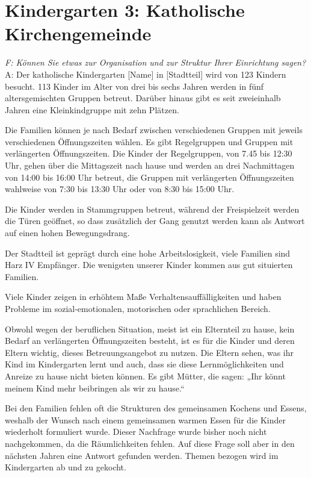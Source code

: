 \section{Kindergarten 3: Katholische Kirchengemeinde}
\begin{linenumbers*}
\emph{F: Können Sie etwas zur Organisation und zur Struktur Ihrer Einrichtung sagen?}
A: Der katholische Kindergarten [Name] in [Stadtteil] wird von 123 Kindern besucht. 113 Kinder im Alter von drei bis sechs Jahren werden in fünf altersgemischten Gruppen betreut.
Darüber hinaus gibt es seit zweieinhalb Jahren eine Kleinkindgruppe mit zehn Plätzen.
 
Die Familien können je nach Bedarf zwischen verschiedenen Gruppen mit jeweils verschiedenen Öffnungszeiten wählen. Es gibt Regelgruppen und Gruppen mit verlängerten Öffnungszeiten. Die Kinder der Regelgruppen, von 7.45 bis 12:30 Uhr, gehen über die Mittagszeit nach hause und werden an drei Nachmittagen von 14:00 bis 16:00 Uhr betreut, die Gruppen mit verlängerten Öffnungszeiten wahlweise von 7:30 bis 13:30 Uhr oder von 8:30 bis 15:00 Uhr.  

Die Kinder werden in Stammgruppen betreut, während der Freispielzeit werden die Türen geöffnet, so dass zusätzlich der Gang genutzt werden kann als Antwort auf einen hohen Bewegungsdrang. 

Der Stadtteil ist geprägt durch eine hohe Arbeitslosigkeit, viele Familien sind Harz IV Empfänger. Die wenigsten unserer Kinder kommen aus gut situierten Familien. 

Viele Kinder zeigen in erhöhtem Maße Verhaltensauffälligkeiten und haben Probleme im sozial-emotionalen, motorischen oder sprachlichen Bereich. 

Obwohl wegen der beruflichen Situation, meist ist ein Elternteil zu hause, kein Bedarf an verlängerten Öffnungszeiten besteht, 
ist es für die Kinder und deren Eltern wichtig, dieses Betreuungsangebot zu nutzen. Die Eltern sehen, was ihr Kind im Kindergarten lernt und auch, dass sie diese Lernmöglichkeiten und Anreize zu hause nicht bieten können.
Es gibt Mütter, die sagen: „Ihr könnt meinem Kind mehr beibringen als wir zu hause.“ 
 
Bei den Familien fehlen oft die Strukturen des gemeinsamen Kochens und Essens, weshalb der Wunsch nach einem gemeinsamen warmen Essen für die Kinder wiederholt formuliert wurde. Dieser Nachfrage wurde bisher noch nicht nachgekommen, da die Räumlichkeiten fehlen. Auf diese Frage soll aber in den nächsten Jahren eine Antwort gefunden werden. Themen bezogen wird im Kindergarten ab und zu gekocht.  


\end{linenumbers*}
